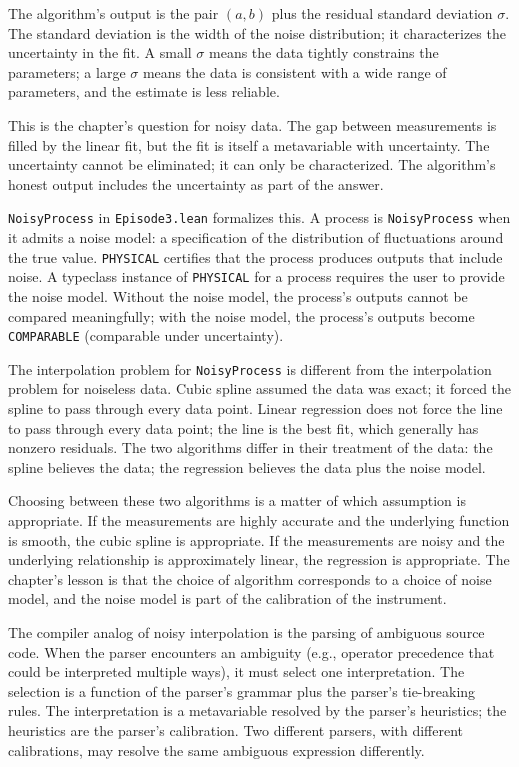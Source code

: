 The algorithm's output is the pair $(a, b)$ plus the residual standard
deviation $\sigma$. The standard deviation is the width of the noise
distribution; it characterizes the uncertainty in the fit. A small
$\sigma$ means the data tightly constrains the parameters; a large
$\sigma$ means the data is consistent with a wide range of parameters,
and the estimate is less reliable.

This is the chapter's question for noisy data. The gap between
measurements is filled by the linear fit, but the fit is itself a
metavariable with uncertainty. The uncertainty cannot be eliminated; it
can only be characterized. The algorithm's honest output includes the
uncertainty as part of the answer.

\texttt{NoisyProcess} in \texttt{Episode3.lean} formalizes this. A
process is \texttt{NoisyProcess} when it admits a noise model: a
specification of the distribution of fluctuations around the true value.
\texttt{PHYSICAL} certifies that the process produces outputs that
include noise. A typeclass instance of \texttt{PHYSICAL} for a process
requires the user to provide the noise model. Without the noise model,
the process's outputs cannot be compared meaningfully; with the noise
model, the process's outputs become \texttt{COMPARABLE} (comparable
under uncertainty).

The interpolation problem for \texttt{NoisyProcess} is different from
the interpolation problem for noiseless data. Cubic spline assumed the
data was exact; it forced the spline to pass through every data point.
Linear regression does not force the line to pass through every data
point; the line is the best fit, which generally has nonzero residuals.
The two algorithms differ in their treatment of the data: the spline
believes the data; the regression believes the data plus the noise
model.

Choosing between these two algorithms is a matter of which assumption
is appropriate. If the measurements are highly accurate and the
underlying function is smooth, the cubic spline is appropriate. If the
measurements are noisy and the underlying relationship is approximately
linear, the regression is appropriate. The chapter's lesson is that the
choice of algorithm corresponds to a choice of noise model, and the
noise model is part of the calibration of the instrument.

The compiler analog of noisy interpolation is the parsing of
ambiguous source code. When the parser encounters an ambiguity (e.g.,
operator precedence that could be interpreted multiple ways), it
must select one interpretation. The selection is a function of the
parser's grammar plus the parser's tie-breaking rules. The
interpretation is a metavariable resolved by the parser's heuristics;
the heuristics are the parser's calibration. Two different parsers,
with different calibrations, may resolve the same ambiguous expression
differently.

